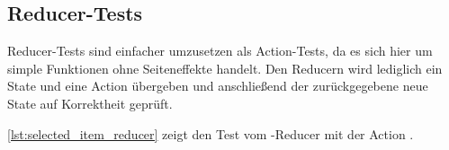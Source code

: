 \subsection{Reducer-Tests}
\label{sec:tf_reducer_tests}

Reducer-Tests sind einfacher umzusetzen als Action-Tests, da es sich hier um
simple Funktionen ohne Seiteneffekte handelt.  Den Reducern wird lediglich ein
State und eine Action übergeben und anschließend der zurückgegebene neue State
auf Korrektheit geprüft.

\cref{lst:selected_item_reducer} zeigt den Test vom -Reducer
mit der Action .


